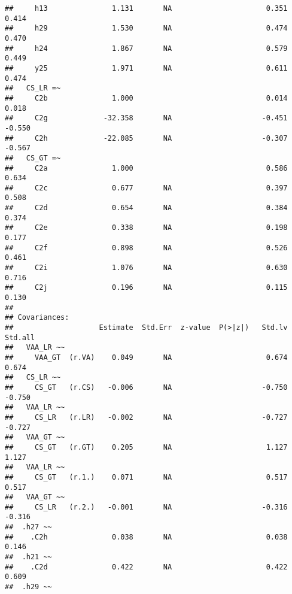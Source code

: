 \documentclass[
]{article}
\begin{document}
\begin{verbatim}
##     h13               1.131       NA                      0.351    0.414
##     h29               1.530       NA                      0.474    0.470
##     h24               1.867       NA                      0.579    0.449
##     y25               1.971       NA                      0.611    0.474
##   CS_LR =~                                                              
##     C2b               1.000                               0.014    0.018
##     C2g             -32.358       NA                     -0.451   -0.550
##     C2h             -22.085       NA                     -0.307   -0.567
##   CS_GT =~                                                              
##     C2a               1.000                               0.586    0.634
##     C2c               0.677       NA                      0.397    0.508
##     C2d               0.654       NA                      0.384    0.374
##     C2e               0.338       NA                      0.198    0.177
##     C2f               0.898       NA                      0.526    0.461
##     C2i               1.076       NA                      0.630    0.716
##     C2j               0.196       NA                      0.115    0.130
## 
## Covariances:
##                    Estimate  Std.Err  z-value  P(>|z|)   Std.lv  Std.all
##   VAA_LR ~~                                                             
##     VAA_GT  (r.VA)    0.049       NA                      0.674    0.674
##   CS_LR ~~                                                              
##     CS_GT   (r.CS)   -0.006       NA                     -0.750   -0.750
##   VAA_LR ~~                                                             
##     CS_LR   (r.LR)   -0.002       NA                     -0.727   -0.727
##   VAA_GT ~~                                                             
##     CS_GT   (r.GT)    0.205       NA                      1.127    1.127
##   VAA_LR ~~                                                             
##     CS_GT   (r.1.)    0.071       NA                      0.517    0.517
##   VAA_GT ~~                                                             
##     CS_LR   (r.2.)   -0.001       NA                     -0.316   -0.316
##  .h27 ~~                                                                
##    .C2h               0.038       NA                      0.038    0.146
##  .h21 ~~                                                                
##    .C2d               0.422       NA                      0.422    0.609
##  .h29 ~~                                                                

\end{verbatim}
\end{document}
